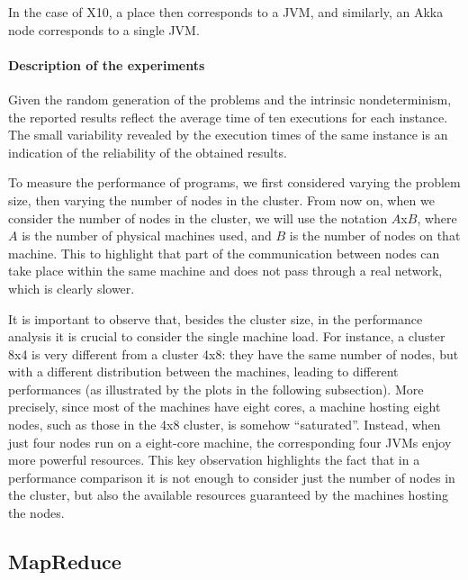 \documentclass[a4paper]{article}
\numberwithin{equation}{section}
\begin{document}
In the case of X10, a place then corresponds to a JVM, 
and similarly, an Akka node corresponds to a
single JVM. 







\paragraph{Description of the experiments}
Given the random generation of the problems and the intrinsic
nondeterminism, 
the reported results reflect the average time of ten executions
for each instance. The small variability revealed by the
execution times of the same instance is an indication of the
reliability of the obtained results. 

To measure the performance of programs, we first considered varying
the problem size, then varying the number of nodes in the cluster. 
From now on, when we consider the number of nodes in the cluster, we
will use the notation $A$x$B$, where $A$ is the number of physical
machines used, and $B$ is the number of nodes on that machine. 
This to highlight that part of the communication between nodes can
take place within the same machine and does not pass through a real
network, which is clearly slower.

It is important to observe that, besides the cluster size, in the
performance analysis it
is crucial to consider the single machine load. For instance, a
cluster 8x4 is very different from a cluster 4x8: they have
the same number of nodes, but with a different distribution between
the machines, leading to different performances (as illustrated by the
plots in the following subsection).
More precisely, since most of the machines have eight cores, 
a machine hosting eight nodes, such as those in the 4x8
cluster, is somehow ``saturated''. Instead, when just four nodes run
on a eight-core machine, the corresponding four JVMs enjoy more
powerful resources.
This key observation highlights the fact that in a performance
comparison it is not enough to consider just the number of  
nodes in the cluster, but also the available resources 
guaranteed by the machines hosting the nodes.




\subsection{MapReduce}
\end{document}
